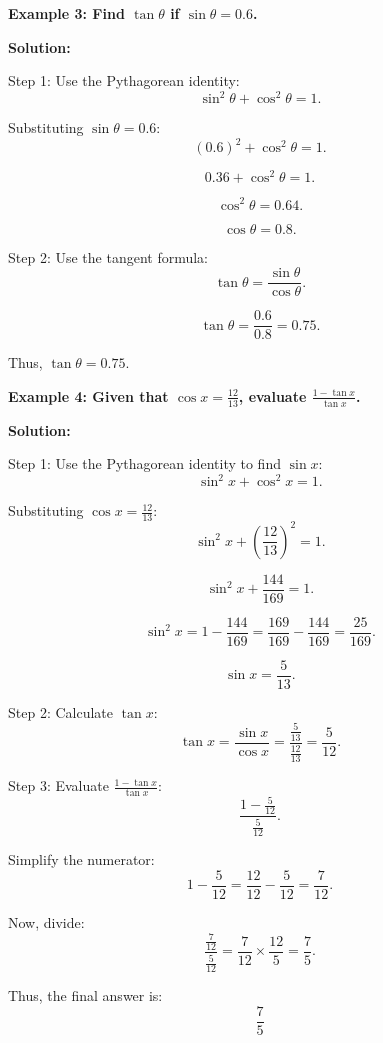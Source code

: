 \begin{flushleft}
	\textbf{Example 3: Find $\tan \theta$ if $\sin \theta = 0.6$.}
	
	\vspace{0.5cm}
	\textbf{Solution:}
	\vspace{0.5cm}
	
	Step 1: Use the Pythagorean identity:
	\[
	\sin^2 \theta + \cos^2 \theta = 1.
	\]
	
	Substituting $\sin \theta = 0.6$:
	\[
	(0.6)^2 + \cos^2 \theta = 1.
	\]
	
	\[
	0.36 + \cos^2 \theta = 1.
	\]
	
	\[
	\cos^2 \theta = 0.64.
	\]
	
	\[
	\cos \theta = 0.8.
	\]
	
	Step 2: Use the tangent formula:
	\[
	\tan \theta = \frac{\sin \theta}{\cos \theta}.
	\]
	
	\[
	\tan \theta = \frac{0.6}{0.8} = 0.75.
	\]
	
	Thus, $\tan \theta = 0.75$.
\end{flushleft}

\begin{flushleft}
	\textbf{Example 4: Given that $\cos x = \frac{12}{13}$, evaluate $\frac{1 - \tan x}{\tan x}$.}
	
	\vspace{0.5cm}
	\textbf{Solution:}
	\vspace{0.5cm}
	
	Step 1: Use the Pythagorean identity to find $\sin x$:
	\[
	\sin^2 x + \cos^2 x = 1.
	\]
	
	Substituting $\cos x = \frac{12}{13}$:
	\[
	\sin^2 x + \left(\frac{12}{13}\right)^2 = 1.
	\]
	
	\[
	\sin^2 x + \frac{144}{169} = 1.
	\]
	
	\[
	\sin^2 x = 1 - \frac{144}{169} = \frac{169}{169} - \frac{144}{169} = \frac{25}{169}.
	\]
	
	\[
	\sin x = \frac{5}{13}.
	\]
	
	Step 2: Calculate $\tan x$:
	\[
	\tan x = \frac{\sin x}{\cos x} = \frac{\frac{5}{13}}{\frac{12}{13}} = \frac{5}{12}.
	\]
	
	Step 3: Evaluate $\frac{1 - \tan x}{\tan x}$:
	\[
	\frac{1 - \frac{5}{12}}{\frac{5}{12}}.
	\]
	
	Simplify the numerator:
	\[
	1 - \frac{5}{12} = \frac{12}{12} - \frac{5}{12} = \frac{7}{12}.
	\]
	
	Now, divide:
	\[
	\frac{\frac{7}{12}}{\frac{5}{12}} = \frac{7}{12} \times \frac{12}{5} = \frac{7}{5}.
	\]
	
	Thus, the final answer is:
	\[
	\frac{7}{5} 
	\]
\end{flushleft}

